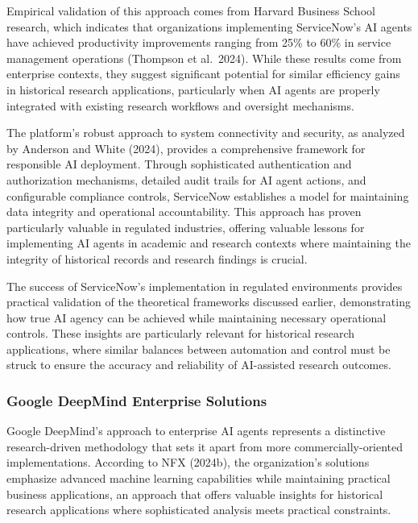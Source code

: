 \documentclass[
]{article}
\begin{document}
Empirical validation of this approach comes from Harvard Business School
research, which indicates that organizations implementing ServiceNow's
AI agents have achieved productivity improvements ranging from 25\% to
60\% in service management operations (Thompson et al.~2024). While
these results come from enterprise contexts, they suggest significant
potential for similar efficiency gains in historical research
applications, particularly when AI agents are properly integrated with
existing research workflows and oversight mechanisms.

The platform's robust approach to system connectivity and security, as
analyzed by Anderson and White (2024), provides a comprehensive
framework for responsible AI deployment. Through sophisticated
authentication and authorization mechanisms, detailed audit trails for
AI agent actions, and configurable compliance controls, ServiceNow
establishes a model for maintaining data integrity and operational
accountability. This approach has proven particularly valuable in
regulated industries, offering valuable lessons for implementing AI
agents in academic and research contexts where maintaining the integrity
of historical records and research findings is crucial.

The success of ServiceNow's implementation in regulated environments
provides practical validation of the theoretical frameworks discussed
earlier, demonstrating how true AI agency can be achieved while
maintaining necessary operational controls. These insights are
particularly relevant for historical research applications, where
similar balances between automation and control must be struck to ensure
the accuracy and reliability of AI-assisted research outcomes.

\subsubsection{Google DeepMind Enterprise
Solutions}\label{google-deepmind-enterprise-solutions}

Google DeepMind's approach to enterprise AI agents represents a
distinctive research-driven methodology that sets it apart from more
commercially-oriented implementations. According to NFX (2024b), the
organization's solutions emphasize advanced machine learning
capabilities while maintaining practical business applications, an
approach that offers valuable insights for historical research
applications where sophisticated analysis meets practical constraints.
\end{document}
